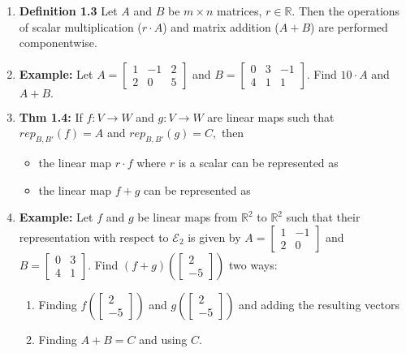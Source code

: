 \documentclass[11pt,fleqn]{article}
\begin{document}
\renewcommand{\headrulewidth}{0pt}
\newcommand{\blank}[1]{\rule{#1}{0.75pt}}
\renewcommand{\d}{\displaystyle}

\newcommand{\bpm}{\begin{pmatrix}}
\newcommand{\epm}{\end{pmatrix}}
\newcommand{\bbm}{\begin{bmatrix}}
\newcommand{\ebm}{\end{bmatrix}}

\vspace*{-0.7in}

\begin{center}
  \large {}
\end{center}

\begin{enumerate}
\item \textbf{Definition 1.3} Let $A$ and $B$ be $m \times n$ matrices, $r \in \mathbb{R}.$ Then the operations of scalar multiplication ($r \cdot A$) and matrix addition ($A + B$) are performed componentwise.\\

\item \textbf{Example:} Let $A=\bbm 1& -1 & 2 \\ 2&0&5 \ebm$ and $B=\bbm 0&3&-1\\ 4&1&1 \ebm.$ Find $10\cdot A$ and $A + B.$
\vfill

\item \textbf{Thm 1.4:} If $f: V \to W$ and $g:V \to W$ are linear maps such that $rep_{B,B'}(f)=A$ and $rep_{B,B'}(g)=C,$ then 
\begin{itemize} \item the linear map $r\cdot f$ where $r$ is a scalar can be represented as\\
\item the linear map $f+g$ can be represented as\\
\end{itemize}

\item \textbf{Example:} Let $f$ and $g$ be linear maps from $\mathbb{R}^2$ to $\mathbb{R}^2$ such that their representation with respect to $\mathcal{E}_2$ is given by $A=\bbm 1& -1  \\ 2&0 \ebm$ and $B=\bbm 0&3\\ 4&1 \ebm.$ Find $(f+g)\left( \bbm 2 \\ -5 \ebm\right)$ two ways:
\begin{enumerate}
    \item Finding $f(\bbm 2 \\ -5 \ebm)$ and $g(\bbm 2 \\ -5 \ebm)$ and adding the resulting vectors
    \vfill
    \item Finding $A+B=C$ and using $C$.
    \vfill
    \end{enumerate}
\end{enumerate}
\vfill



\end{document}
